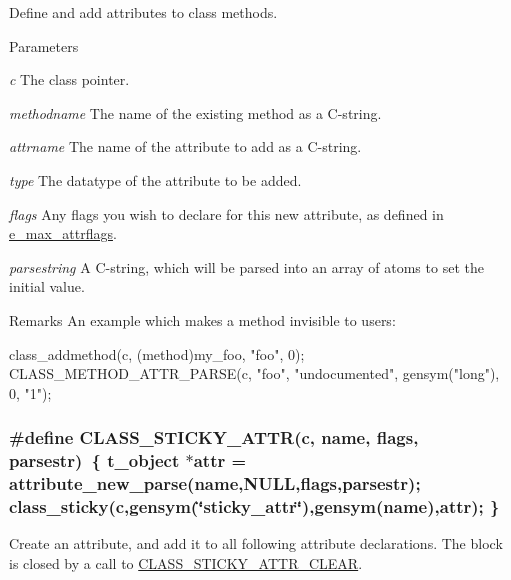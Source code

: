 Define and add attributes to class methods. 
\begin{DoxyParams}{Parameters}
\item[{\em c}]The class pointer. \item[{\em methodname}]The name of the existing method as a C-\/string. \item[{\em attrname}]The name of the attribute to add as a C-\/string. \item[{\em type}]The datatype of the attribute to be added. \item[{\em flags}]Any flags you wish to declare for this new attribute, as defined in \hyperlink{group__attr_gaf296cfc6741bb19207f6ed8062809115}{e\_\-max\_\-attrflags}. \item[{\em parsestring}]A C-\/string, which will be parsed into an array of atoms to set the initial value.\end{DoxyParams}
\begin{DoxyRemark}{Remarks}
An example which makes a method invisible to users: 
\begin{DoxyCode}
    class_addmethod(c, (method)my_foo, "foo", 0);
    CLASS_METHOD_ATTR_PARSE(c, "foo", "undocumented", gensym("long"), 0, "1");
\end{DoxyCode}
 
\end{DoxyRemark}
\hypertarget{group__attr_ga51ce88a6d20e819ad703514e583e5562}{
\subsubsection[{CLASS\_\-STICKY\_\-ATTR}]{\setlength{\rightskip}{0pt plus 5cm}\#define CLASS\_\-STICKY\_\-ATTR(c, \/  name, \/  flags, \/  parsestr)~\{ {\bf t\_\-object} $\ast$attr = attribute\_\-new\_\-parse(name,NULL,flags,parsestr); class\_\-sticky(c,gensym(\char`\"{}sticky\_\-attr\char`\"{}),gensym(name),attr); \}}}
\label{group__attr_ga51ce88a6d20e819ad703514e583e5562}


Create an attribute, and add it to all following attribute declarations. The block is closed by a call to \hyperlink{group__attr_gadf3ca4c22b0273a96f5644788489970b}{CLASS\_\-STICKY\_\-ATTR\_\-CLEAR}.


